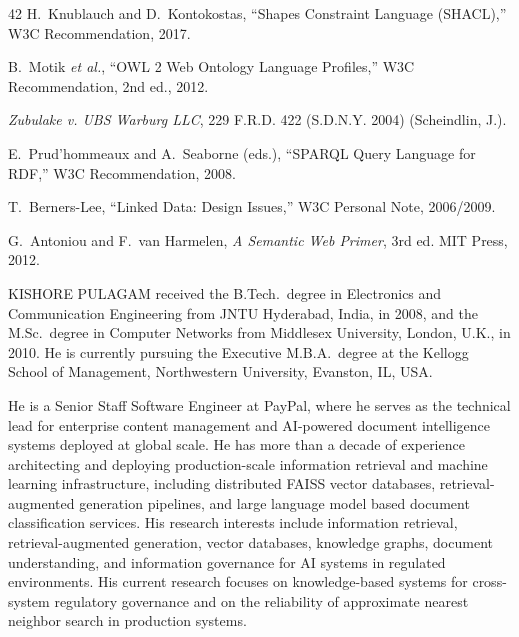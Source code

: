 \documentclass{ieeeaccess}
\begin{document}
\begin{thebibliography}{42}
H.~Knublauch and D.~Kontokostas, ``Shapes Constraint Language (SHACL),'' W3C Recommendation, 2017.

B.~Motik \textit{et al.}, ``OWL 2 Web Ontology Language Profiles,'' W3C Recommendation, 2nd ed., 2012.

\textit{Zubulake v. UBS Warburg LLC}, 229 F.R.D. 422 (S.D.N.Y. 2004) (Scheindlin, J.).

E.~Prud'hommeaux and A.~Seaborne (eds.), ``SPARQL Query Language for RDF,'' W3C Recommendation, 2008.

T.~Berners-Lee, ``Linked Data: Design Issues,'' W3C Personal Note, 2006/2009.

G.~Antoniou and F.~van Harmelen, \textit{A Semantic Web Primer}, 3rd ed. MIT Press, 2012.

\end{thebibliography}

\begin{IEEEbiographynophoto}{KISHORE PULAGAM}
received the B.Tech.\ degree in Electronics and Communication Engineering from JNTU Hyderabad, India, in 2008, and the M.Sc.\ degree in Computer Networks from Middlesex University, London, U.K., in 2010. He is currently pursuing the Executive M.B.A.\ degree at the Kellogg School of Management, Northwestern University, Evanston, IL, USA.

He is a Senior Staff Software Engineer at PayPal, where he serves as the technical lead for enterprise content management and AI-powered document intelligence systems deployed at global scale. He has more than a decade of experience architecting and deploying production-scale information retrieval and machine learning infrastructure, including distributed FAISS vector databases, retrieval-augmented generation pipelines, and large language model based document classification services. His research interests include information retrieval, retrieval-augmented generation, vector databases, knowledge graphs, document understanding, and information governance for AI systems in regulated environments. His current research focuses on knowledge-based systems for cross-system regulatory governance and on the reliability of approximate nearest neighbor search in production systems.
\end{IEEEbiographynophoto}

\EOD
\end{document}
